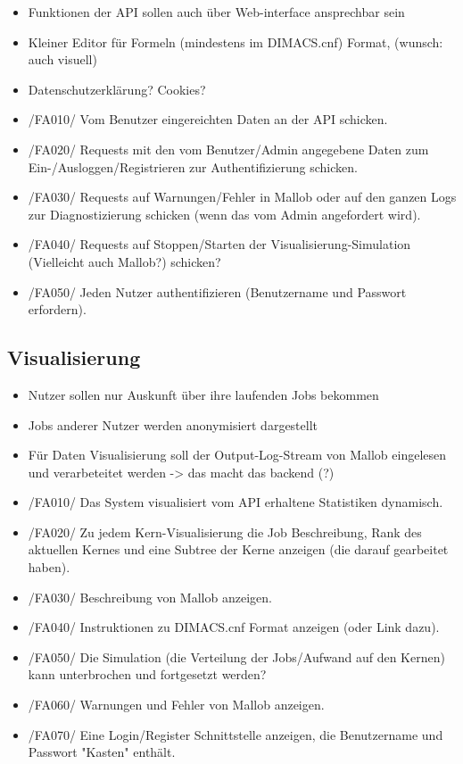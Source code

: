 
\begin{itemize}
    \item Funktionen der API sollen auch über Web-interface ansprechbar sein
    \item Kleiner Editor für Formeln (mindestens im DIMACS.cnf) Format, (wunsch: auch visuell)
    \item Datenschutzerklärung? Cookies?
    \item /FA010/ Vom Benutzer eingereichten Daten an der API schicken.
    \item /FA020/ Requests mit den vom Benutzer/Admin angegebene Daten zum Ein-/Ausloggen/Registrieren zur Authentifizierung schicken.
    \item /FA030/ Requests auf Warnungen/Fehler in Mallob oder auf den ganzen Logs zur Diagnostizierung schicken (wenn das vom Admin angefordert wird).
    \item /FA040/ Requests auf Stoppen/Starten der Visualisierung-Simulation (Vielleicht auch Mallob?) schicken?
    \item /FA050/ Jeden Nutzer authentifizieren (Benutzername und Passwort erfordern).
\end{itemize}



\subsection{Visualisierung}
\begin{itemize}
    \item Nutzer sollen nur Auskunft über ihre laufenden Jobs bekommen 
    \item Jobs anderer Nutzer werden anonymisiert dargestellt
    \item Für Daten Visualisierung soll der Output-Log-Stream von Mallob eingelesen und verarbeteitet werden -> das macht das backend (?)
    \item /FA010/ Das System visualisiert vom API erhaltene Statistiken dynamisch.
    \item /FA020/ Zu jedem Kern-Visualisierung die Job Beschreibung, Rank des aktuellen Kernes und eine Subtree der Kerne anzeigen (die darauf gearbeitet haben).
    \item /FA030/ Beschreibung von Mallob anzeigen.
    \item /FA040/ Instruktionen zu DIMACS.cnf Format anzeigen (oder Link dazu).
    \item /FA050/ Die Simulation (die Verteilung der Jobs/Aufwand auf den Kernen) kann unterbrochen und fortgesetzt werden?
    \item /FA060/ Warnungen und Fehler von Mallob anzeigen.
    \item /FA070/ Eine Login/Register Schnittstelle anzeigen, die Benutzername und Passwort "Kasten" enthält.
\end{itemize}


